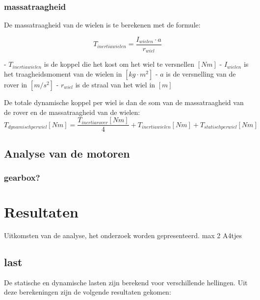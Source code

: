 \documentclass{article}
\begin{document}
        \subsubsection*{massatraagheid}

        De massatraagheid van de wielen is te berekenen met de formule:

        $$T_{inertiawielen} = \frac{I_{wielen} \cdot a}{r_{wiel}}$$
        
        - $T_{inertiawielen}$ is de koppel die het kost om het wiel te versnellen $[Nm]$ \newline
        - $I_{wielen}$ is het traagheidsmoment van de wielen in $[kg \cdot m^2]$ \newline
        - $a$ is de versnelling van de rover in $[m/s^2]$ \newline
        - $r_{wiel}$ is de straal van het wiel in $[m]$ \newline \newline

        De totale dynamische koppel per wiel is dan de som van de massatraagheid van de rover en de massatraagheid van de wielen:
        $$T_{dynamisch per wiel}[Nm] = \frac{T_{inertiarover}[Nm]}{4} + T_{inertiawielen}[Nm] + T_{statischperwiel}[Nm]$$ 


\subsection{Analyse van de motoren}
\subsubsection{gearbox?}

\section{Resultaten}
    Uitkomsten van de analyse, het onderzoek worden gepresenteerd. max 2 A4tjes

    \subsection{last}
    De statische en dynamische lasten zijn berekend voor verschillende hellingen. 
    Uit deze berekeningen zijn de volgende resultaten gekomen: 
\end{document}

